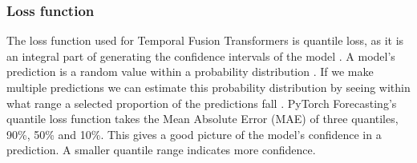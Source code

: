     \pagebreak
    \subsubsection{Loss function}\label{sec:loss_function}
    The loss function used for Temporal Fusion Transformers is quantile loss, as it is an integral part of generating the confidence intervals of the model \cite{lim_temporal_2020}.
    A model's prediction is a random value within a probability distribution \cite{wen_multi-horizon_2018}. If we make multiple predictions we can estimate this probability distribution by seeing within what range a selected proportion of the predictions fall \cite{koenker_quantile_2001}. PyTorch Forecasting's quantile loss function takes the Mean Absolute Error (MAE) of three quantiles, 90\%, 50\% and 10\%. This gives a good picture of the model's confidence in a prediction. A smaller quantile range indicates more confidence. 
    
    
    